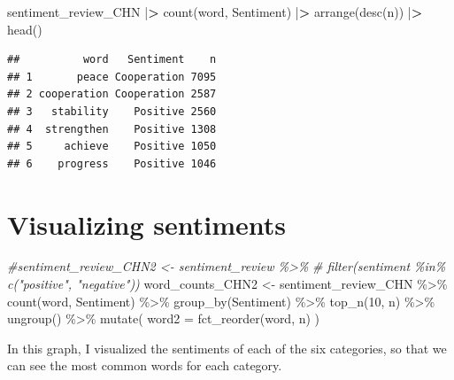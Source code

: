 \documentclass[
]{article}
\newenvironment{Shaded}{\begin{snugshade}}{\end{snugshade}}
\newcommand{\AttributeTok}[1]{\textcolor[rgb]{0.77,0.63,0.00}{#1}}
\newcommand{\CommentTok}[1]{\textcolor[rgb]{0.56,0.35,0.01}{\textit{#1}}}
\newcommand{\DecValTok}[1]{\textcolor[rgb]{0.00,0.00,0.81}{#1}}
\newcommand{\ErrorTok}[1]{\textcolor[rgb]{0.64,0.00,0.00}{\textbf{#1}}}
\newcommand{\FunctionTok}[1]{\textcolor[rgb]{0.00,0.00,0.00}{#1}}
\newcommand{\NormalTok}[1]{#1}
\newcommand{\OtherTok}[1]{\textcolor[rgb]{0.56,0.35,0.01}{#1}}
\newcommand{\SpecialCharTok}[1]{\textcolor[rgb]{0.00,0.00,0.00}{#1}}
\begin{document}
\begin{Shaded}
\begin{Highlighting}[]
\NormalTok{sentiment\_review\_CHN }\SpecialCharTok{|}\ErrorTok{\textgreater{}} 
    \FunctionTok{count}\NormalTok{(word, Sentiment) }\SpecialCharTok{|}\ErrorTok{\textgreater{}} 
    \FunctionTok{arrange}\NormalTok{(}\FunctionTok{desc}\NormalTok{(n)) }\SpecialCharTok{|}\ErrorTok{\textgreater{}} 
    \FunctionTok{head}\NormalTok{()}
\end{Highlighting}
\end{Shaded}

\begin{verbatim}
##          word   Sentiment    n
## 1       peace Cooperation 7095
## 2 cooperation Cooperation 2587
## 3   stability    Positive 2560
## 4  strengthen    Positive 1308
## 5     achieve    Positive 1050
## 6    progress    Positive 1046
\end{verbatim}

\hypertarget{visualizing-sentiments}{%
\section{Visualizing sentiments}\label{visualizing-sentiments}}

\begin{Shaded}
\begin{Highlighting}[]
\CommentTok{\#sentiment\_review\_CHN2 \textless{}{-} sentiment\_review \%\textgreater{}\%  }
 \CommentTok{\# filter(sentiment \%in\% c("positive", "negative"))  }
\NormalTok{word\_counts\_CHN2 }\OtherTok{\textless{}{-}}\NormalTok{ sentiment\_review\_CHN }\SpecialCharTok{\%\textgreater{}\%}  
  \FunctionTok{count}\NormalTok{(word, Sentiment) }\SpecialCharTok{\%\textgreater{}\%}  
  \FunctionTok{group\_by}\NormalTok{(Sentiment) }\SpecialCharTok{\%\textgreater{}\%} 
  \FunctionTok{top\_n}\NormalTok{(}\DecValTok{10}\NormalTok{, n) }\SpecialCharTok{\%\textgreater{}\%}  
  \FunctionTok{ungroup}\NormalTok{() }\SpecialCharTok{\%\textgreater{}\%}  
  \FunctionTok{mutate}\NormalTok{( }
    \AttributeTok{word2 =} \FunctionTok{fct\_reorder}\NormalTok{(word, n) }
\NormalTok{  )}
\end{Highlighting}
\end{Shaded}

In this graph, I visualized the sentiments of each of the six
categories, so that we can see the most common words for each category.
\end{document}
